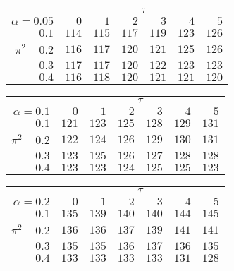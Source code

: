 \begin{tabular}{r|rrrrrr}
\hline\hline
 &\multicolumn{6}{c}{$\tau$} \\ 
 $\alpha = 0.05$ & $0$ & $1$ & $2$ & $3$ & $4$ & $5$ \\ 
 \hline$0.1$ & $114$ & $115$ & $117$ & $119$ & $123$ & $126$\\ 
$\pi^2\;\;\;$ $0.2$ & $116$ & $117$ & $120$ & $121$ & $125$ & $126$\\ 
$0.3$ & $117$ & $117$ & $120$ & $122$ & $123$ & $123$\\ 
$0.4$ & $116$ & $118$ & $120$ & $121$ & $121$ & $120$\\ 
 \hline 
 \end{tabular}
 
 \vspace{2em} 
 
\begin{tabular}{r|rrrrrr}
\hline\hline
 &\multicolumn{6}{c}{$\tau$} \\ 
 $\alpha = 0.1$ & $0$ & $1$ & $2$ & $3$ & $4$ & $5$ \\ 
 \hline$0.1$ & $121$ & $123$ & $125$ & $128$ & $129$ & $131$\\ 
$\pi^2\;\;\;$ $0.2$ & $122$ & $124$ & $126$ & $129$ & $130$ & $131$\\ 
$0.3$ & $123$ & $125$ & $126$ & $127$ & $128$ & $128$\\ 
$0.4$ & $123$ & $123$ & $124$ & $125$ & $125$ & $123$\\ 
 \hline 
 \end{tabular}
 
 \vspace{2em} 
 
\begin{tabular}{r|rrrrrr}
\hline\hline
 &\multicolumn{6}{c}{$\tau$} \\ 
 $\alpha = 0.2$ & $0$ & $1$ & $2$ & $3$ & $4$ & $5$ \\ 
 \hline$0.1$ & $135$ & $139$ & $140$ & $140$ & $144$ & $145$\\ 
$\pi^2\;\;\;$ $0.2$ & $136$ & $136$ & $137$ & $139$ & $141$ & $141$\\ 
$0.3$ & $135$ & $135$ & $136$ & $137$ & $136$ & $135$\\ 
$0.4$ & $133$ & $133$ & $133$ & $133$ & $131$ & $128$\\ 
 \hline 
 \end{tabular}